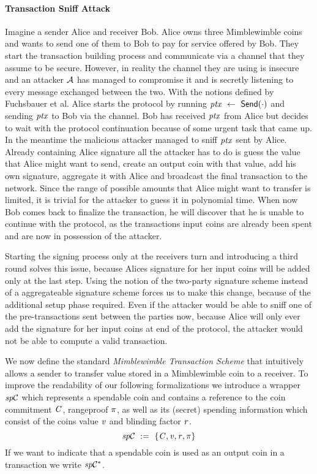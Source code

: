 \paragraph{Transaction Sniff Attack}
Imagine a sender Alice and receiver Bob.
Alice owns three Mimblewimble coins and wants to send one of them to Bob to pay for service offered by Bob.
They start the transaction building process and communicate via a channel that they assume to be secure.
However, in reality the channel they are using is insecure and an attacker $\mathcal{A}$ has managed to compromise it and is secretly listening to every message exchanged between the two.
With the notions defined by Fuchsbauer et al. Alice starts the protocol by running $\mathit{ptx} ~\leftarrow~ \mathsf{Send}(\cdot)$ and sending $\mathit{ptx}$ to Bob via the channel.
Bob has received $\mathit{ptx}$ from Alice but decides to wait with the protocol continuation because of some urgent task that came up.
In the meantime the malicious attacker managed to sniff $\mathit{ptx}$ sent by Alice.
Already containing Alice signature all the attacker has to do is guess the value that Alice might want to send, create an output coin with that value, add his own signature, aggregate it with Alice and broadcast the final transaction to the network.
Since the range of possible amounts that Alice might want to transfer is limited, it is trivial for the attacker to guess it in polynomial time.
When now Bob comes back to finalize the transaction, he will discover that he is unable to continue with the protocol, as the transactions input coins are already been spent and are now in possession of the attacker.

Starting the signing process only at the receivers turn and introducing a third round solves this issue, because Alices signature for her input coins will be added only at the last step.
Using the notion of the two-party signature scheme instead of a aggregateable signature scheme forces us to make this change, because of the additional setup phase required.
Even if the attacker would be able to sniff one of the pre-transactions sent between the parties now, because Alice will only ever add the signature for her input coins at end of the protocol, the attacker would not be able to compute a valid transaction.

We now define the standard \emph{Mimblewimble Transaction Scheme} that intuitively allows a sender to transfer value stored in a Mimblewimble coin to a receiver.
To improve the readability of our following formalizations we introduce a wrapper $\mathit{sp}\mathcal{C}$ which represents a spendable coin and contains a reference to the coin commitment $\mathit{C}$, rangeproof $\pi$, as well as its (secret) spending information which consist of the coins value $\mathit{v}$ and blinding factor $\mathit{r}$.
\[ \mathit{sp}\mathcal{C} ~:=~ \{ \mathit{C}, \mathit{v}, \mathit{r}, \pi \} \]
If we want to indicate that a spendable coin is used as an output coin in a transaction we write $\mathit{sp}\mathcal{C}^*$.

